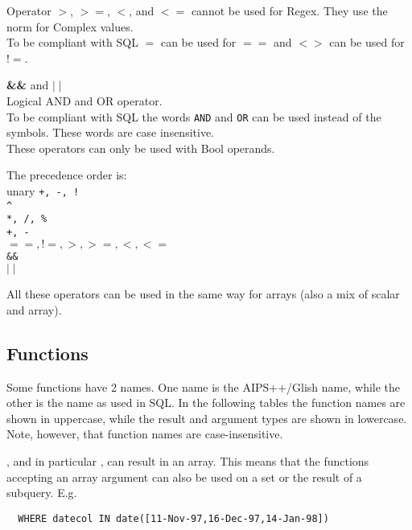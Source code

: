 \begin{description}
       Operator $>$, $>=$, $<$, and $<=$ cannot be used for Regex.
       They use the norm for Complex values.
       \\To be compliant with SQL $=$ can be used for
       $==$ and $<>$ can be used for $!=$.
  \item[] \textbf{\&\&} and \textbf{$\mid\mid$}
       \\Logical AND and OR operator. 
       \\To be compliant with SQL the
       words \texttt{AND} and \texttt{OR} can be used instead of the
       symbols. These words are case insensitive.
       \\These operators can only be used with Bool operands.
\end{description}
\begin{description}
  \item The precedence order is:
       \\unary \texttt{+, -, !}
       \\\verb+^+
       \\\texttt{*, /, \%}
       \\\texttt{+, -}
       \\\texttt{$==, !=, >, >=, <, <=$}
       \\\texttt{\&\&}
       \\\texttt{$\mid\mid$}
\end{description}
All these operators can be used in the same way for arrays
(also a mix of scalar and array).

\subsection{\label{TAQL:FUNCTIONS}Functions}
Some functions have 2 names. One name is the AIPS++/Glish name, while the
other is the name as used in SQL.
In the following tables the function names are shown in uppercase,
while the result and argument types are shown in lowercase.
Note, however, that function names are case-insensitive.

, and in particular
, can result in an array.
This means that the functions accepting an array argument can also
be used on a set or the result of a subquery. E.g.
\begin{verbatim}
  WHERE datecol IN date([11-Nov-97,16-Dec-97,14-Jan-98])
\end{verbatim}
